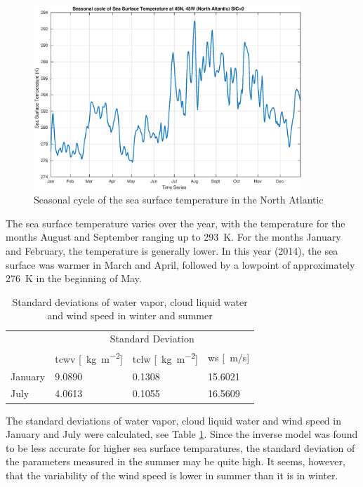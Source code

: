\documentclass[11pt, a4paper]{article}
\begin{document}
\begin{figure}[h]
	\centering
	\includegraphics[width=0.9\textwidth]{TimeSeries.eps}
	\caption{Seasonal cycle of the sea surface temperature in the North Atlantic}
	\label{fig:timeseries}
\end{figure}

The sea surface temperature varies over the year, with the temperature for the months August and September ranging up to \SI{293}{K}. For the months January and February, the temperature is generally lower. In this year (2014), the sea surface was warmer in March and April, followed by a lowpoint of approximately \SI{276}{K} in the beginning of May.
\newline

\begin{table}[h]
\centering
\begin{tabular}{@{} l l l l @{}}
 & \multicolumn{3}{c}{Standard Deviation}
\tabularnewline
\cmidrule(l{1mm}){2-4}
 & tcwv [\SI{}{\kilo\gram\per\square\meter}] & tclw [\SI{}{\kilo\gram\per\square\meter}] & ws [\SI{}{m/s}] \\
\midrule
January & \SI{9.0890}{} & \SI{0.1308}{} & \SI{15.6021}{} \\
July & \SI{4.0613}{} & \SI{0.1055}{} & \SI{16.5609}{} \\
\midrule
\end{tabular}
\caption{Standard deviations of water vapor, cloud liquid water and wind speed in winter and summer}
\label{tab:jan_jul}
\end{table}

The standard deviations of water vapor, cloud liquid water and wind speed in January and July were calculated, see Table \ref{tab:jan_jul}. Since the inverse model was found to be less accurate for higher sea surface temparatures, the standard deviation of the parameters measured in the summer may be quite high. It seems, however, that the variability of the wind speed is lower in summer than it is in winter.
\end{document}
